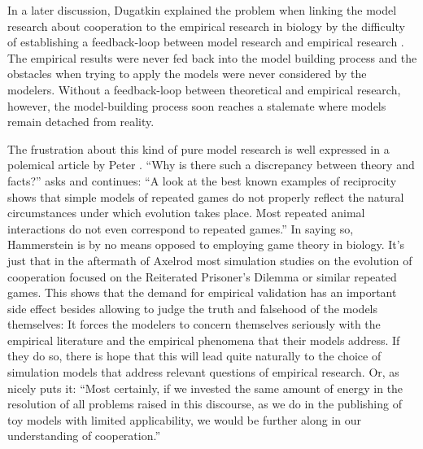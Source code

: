 \documentclass[12pt, english, a4paper]{article}
\begin{document}
In a later discussion, Dugatkin explained the problem when linking the
model research about cooperation to the empirical research in biology
by the difficulty of establishing a feedback-loop between model
research and empirical research \citep[57-58]{dugatkin:1998a}. The
empirical results were never fed back into the model building process
and the obstacles when trying to apply the models were never
considered by the modelers. Without a feedback-loop between
theoretical and empirical research, however, the model-building
process soon reaches a stalemate where models remain detached from
reality.

The frustration about this kind of pure model research is well
expressed in a polemical article by Peter
\citet{hammerstein:2003}. “Why is there such a discrepancy between
theory and facts?” asks \citet[83]{hammerstein:2003} and continues: “A
look at the best known examples of reciprocity shows that simple
models of repeated games do not properly reflect the natural
circumstances under which evolution takes place. Most repeated animal
interactions do not even correspond to repeated games.” In saying so,
Hammerstein is by no means opposed to employing game theory in
biology. It’s just that in the aftermath of Axelrod most simulation
studies on the evolution of cooperation focused on the Reiterated
Prisoner’s Dilemma or similar repeated games. This shows that the
demand for empirical validation has an important side effect besides
allowing to judge the truth and falsehood of the models themselves: It
forces the modelers to concern themselves seriously with the empirical
literature and the empirical phenomena that their models address. If
they do so, there is hope that this will lead quite naturally to the
choice of simulation models that address relevant questions of
empirical research. Or, as \citet[92]{hammerstein:2003} nicely puts
it: “Most certainly, if we invested the same amount of energy in the
resolution of all problems raised in this discourse, as we do in the
publishing of toy models with limited applicability, we would be
further along in our understanding of cooperation.”
\end{document}
